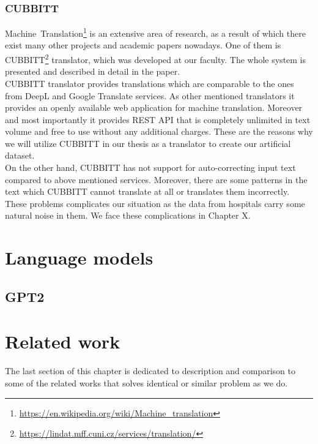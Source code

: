 \subsubsection{CUBBITT}
Machine~Translation\footnote[4]{\url{https://en.wikipedia.org/wiki/Machine\_translation}} is an extensive area of research, as a result of which there exist many other projects and academic papers nowadays. One of them is CUBBITT\footnote[5]{\url{https://lindat.mff.cuni.cz/services/translation/}} translator, which was developed at our faculty. The whole system is presented and described in detail in the \citet{biblio:PoToTransformingmachine2020} paper. \\

CUBBITT translator provides translations which are comparable to the ones from DeepL and Google Translate services. As other mentioned translators it provides an openly available web application for machine translation. Moreover and most importantly it provides REST API that is completely unlimited in text volume and free to use without any additional charges. These are the reasons why we will utilize CUBBITT in our thesis as a translator to create our artificial dataset.\\

On the other hand, CUBBITT has not support for auto-correcting input text compared to above mentioned services. Moreover, there are some patterns in the text which CUBBITT cannot translate at all or translates them incorrectly. These problems complicates our situation as the data from hospitals carry some natural noise in them. We face these complications in Chapter X.

\section{Language models}
\subsection{GPT2}

\section{Related work}
The last section of this chapter is dedicated to description and comparison to some of the related works that solves identical or similar problem as we do.









